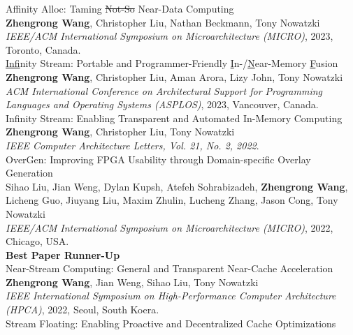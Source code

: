 \documentclass[a4paper]{article}
\newenvironment{changemargin}[2]{%
  \begin{list}{}{%
    \setlength{\topsep}{0pt}%
    \setlength{\leftmargin}{#1}%
    \setlength{\rightmargin}{#2}%
    \setlength{\listparindent}{\parindent}%
    \setlength{\itemindent}{\parindent}%
    \setlength{\parsep}{\parskip}%
  }%
  \item[]}{\end{list}
}
\newenvironment{body} {
	\vspace*{-16pt}
	\begin{changemargin}{-0.5in}{-0.5in}
  }	
	{\end{changemargin}
}
\begin{document}
\begin{body}
	\vspace{14pt}
    Affinity Alloc: Taming \sout{Not-So} Near-Data Computing \\
	\textbf{Zhengrong Wang}, Christopher Liu, Nathan Beckmann, Tony Nowatzki \\
	\emph{IEEE/ACM International Symposium on Microarchitecture (MICRO)}, 2023, Toronto, Canada.\\
	\vspace{6pt}
    \underline{Inf}inity Stream: Portable and Programmer-Friendly \underline{I}n-/\underline{N}ear-Memory \underline{F}usion \\
	\textbf{Zhengrong Wang}, Christopher Liu, Aman Arora, Lizy John, Tony Nowatzki \\
	\emph{ACM International Conference on Architectural Support for Programming Languages and Operating Systems (ASPLOS)}, 2023, Vancouver, Canada.\\
	\vspace{6pt}
    Infinity Stream: Enabling Transparent and Automated In-Memory Computing \\
	\textbf{Zhengrong Wang}, Christopher Liu, Tony Nowatzki \\
    \emph{IEEE Computer Architecture Letters, Vol. 21, No. 2, 2022}.\\
	\vspace{6pt}
	OverGen: Improving FPGA Usability through Domain-specific Overlay Generation\\
	Sihao Liu, Jian Weng, Dylan Kupsh, Atefeh Sohrabizadeh, \textbf{Zhengrong Wang}, Licheng Guo, Jiuyang Liu, Maxim Zhulin, Lucheng Zhang, Jason Cong, Tony Nowatzki \\
	\emph{IEEE/ACM International Symposium on Microarchitecture (MICRO)}, 2022, Chicago, USA.\\
	\textbf{Best Paper Runner-Up} \\
	\vspace{6pt}
	Near-Stream Computing: General and Transparent Near-Cache Acceleration \\
	\textbf{Zhengrong Wang}, Jian Weng, Sihao Liu, Tony Nowatzki \\
	\emph{IEEE International Symposium on High-Performance Computer Architecture (HPCA)}, 2022, Seoul, South Koera.\\
	\vspace{6pt}
	Stream Floating: Enabling Proactive and Decentralized Cache Optimizations \\

\end{body}
\end{document}
